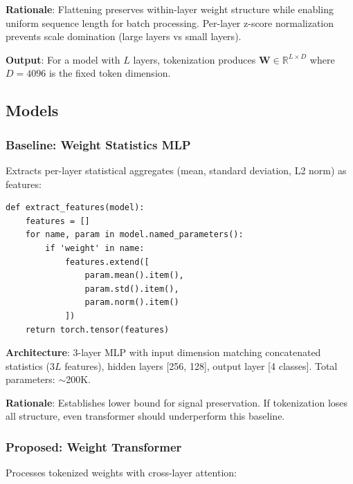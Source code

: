 \textbf{Rationale}: Flattening preserves within-layer weight structure while enabling uniform sequence length for batch processing. Per-layer z-score normalization prevents scale domination (large layers vs small layers).

\textbf{Output}: For a model with $L$ layers, tokenization produces $\mathbf{W} \in \mathbb{R}^{L \times D}$ where $D=4096$ is the fixed token dimension.

\subsection{Models}

\subsubsection{Baseline: Weight Statistics MLP}

Extracts per-layer statistical aggregates (mean, standard deviation, L2 norm) as features:

\begin{verbatim}
def extract_features(model):
    features = []
    for name, param in model.named_parameters():
        if 'weight' in name:
            features.extend([
                param.mean().item(),
                param.std().item(),
                param.norm().item()
            ])
    return torch.tensor(features)
\end{verbatim}

\textbf{Architecture}: 3-layer MLP with input dimension matching concatenated statistics ($3L$ features), hidden layers [256, 128], output layer [4 classes]. Total parameters: $\sim$200K.

\textbf{Rationale}: Establishes lower bound for signal preservation. If tokenization loses all structure, even transformer should underperform this baseline.

\subsubsection{Proposed: Weight Transformer}

Processes tokenized weights with cross-layer attention:


